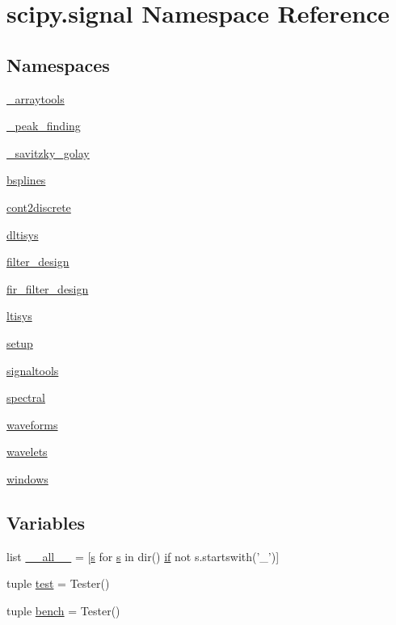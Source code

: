 \hypertarget{namespacescipy_1_1signal}{}\section{scipy.\+signal Namespace Reference}
\label{namespacescipy_1_1signal}
\subsection*{Namespaces}
\begin{DoxyCompactItemize}
\item 
 \hyperlink{namespacescipy_1_1signal_1_1__arraytools}{\+\_\+arraytools}
\item 
 \hyperlink{namespacescipy_1_1signal_1_1__peak__finding}{\+\_\+peak\+\_\+finding}
\item 
 \hyperlink{namespacescipy_1_1signal_1_1__savitzky__golay}{\+\_\+savitzky\+\_\+golay}
\item 
 \hyperlink{namespacescipy_1_1signal_1_1bsplines}{bsplines}
\item 
 \hyperlink{namespacescipy_1_1signal_1_1cont2discrete}{cont2discrete}
\item 
 \hyperlink{namespacescipy_1_1signal_1_1dltisys}{dltisys}
\item 
 \hyperlink{namespacescipy_1_1signal_1_1filter__design}{filter\+\_\+design}
\item 
 \hyperlink{namespacescipy_1_1signal_1_1fir__filter__design}{fir\+\_\+filter\+\_\+design}
\item 
 \hyperlink{namespacescipy_1_1signal_1_1ltisys}{ltisys}
\item 
 \hyperlink{namespacescipy_1_1signal_1_1setup}{setup}
\item 
 \hyperlink{namespacescipy_1_1signal_1_1signaltools}{signaltools}
\item 
 \hyperlink{namespacescipy_1_1signal_1_1spectral}{spectral}
\item 
 \hyperlink{namespacescipy_1_1signal_1_1waveforms}{waveforms}
\item 
 \hyperlink{namespacescipy_1_1signal_1_1wavelets}{wavelets}
\item 
 \hyperlink{namespacescipy_1_1signal_1_1windows}{windows}
\end{DoxyCompactItemize}
\subsection*{Variables}
\begin{DoxyCompactItemize}
\item 
list \hyperlink{namespacescipy_1_1signal_a015d8d778f01ce16aeaba6d7cba90fef}{\+\_\+\+\_\+all\+\_\+\+\_\+} = \mbox{[}\hyperlink{indexexpr_8h_ae024b0db549122b44c349ae28ec990dc}{s} for \hyperlink{indexexpr_8h_ae024b0db549122b44c349ae28ec990dc}{s} in dir() \hyperlink{minmax_8h_a30a0ee9fee303f01d9c5e6f669e0dfe9}{if} not s.\+startswith('\+\_\+')\mbox{]}
\item 
tuple \hyperlink{namespacescipy_1_1signal_a80e4b5ecb4456e321bc6461d7e9caf78}{test} = Tester()
\item 
tuple \hyperlink{namespacescipy_1_1signal_a71e6242ecfc7f1dc2f1bcd042617ff96}{bench} = Tester()
\end{DoxyCompactItemize}


